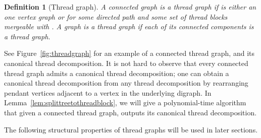 \documentclass[11pt]{article}
\newtheorem{definition}{Definition}[section]
\theoremstyle{remark}
\begin{document}
\begin{definition}[Thread graph]
A connected graph  is a \emph{thread graph}
if  is either an one vertex graph or  for some directed path  and some set of thread blocks  mergeable with . A graph is a \emph{thread graph} if each of its connected components is a thread graph. 
\end{definition}

See Figure~\ref{fig:threadgraph} for an example of a connected thread graph, and its canonical thread decomposition.
It is not hard to observe that every connected thread graph admits a canonical thread decomposition; one can obtain a canonical thread decomposition from any thread decomposition by rearranging pendant vertices adjacent to a vertex in the underlying digraph.
In Lemma~\ref{lem:splittreetothreadblock}, we will give a polynomial-time algorithm that given a connected thread graph, outputs its canonical thread decomposition.


The following structural properties of thread graphs will be used in later sections.
\end{document}
